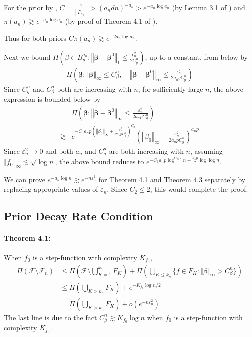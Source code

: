 \documentclass[12pt]{article}
\newcommand{\bm}[1]{\boldsymbol{#1}}
\newcommand{\norm}[1]{\left\Vert#1\right\Vert}
\newcommand{\1}{\mathbb{I}}
\def\C {\,|\:}
\def\C {\,|\:}
\def\mF{\mathcal{F}}
\def\b{\bm{\beta}}
\def\b{\bm{\beta}}
\def\C{\mbox{\boldmath$C$}}
\def\b{\mbox{\boldmath$b$}}
\def\C {\,|\:}
\def\C {\,|\:}
\def\b{\bm{\beta}}
\def\b{\bm{\beta}}
\theoremstyle{plain}
\theoremstyle{definition}
\theoremstyle{remark}
\begin{document}
For the prior by \cite{denison1998bayesian},
$C=\frac{1}{\C F_{a_n}\C} > (a_n d n)^{-a_n} > e^{-a_n \log a_n}$  (by Lemma 3.1 of \cite{rockova2020posterior}) and $\pi(a_n) \gtrsim e^{-a_n \log a_n}$ (by proof of Theorem 4.1 of \cite{rockova2020posterior}).

Thus for both priors $C\pi(a_n) \gtrsim e^{-2a_n\log a_n}$.

Next we bound $\Pi \left (\beta \in B_n^{a_n}: \norm{\b-\b^0}_1 \le \frac{\epsilon_n^2}{2C_g^n} \right)$, up to a constant, from below by
\begin{align*}
 \Pi \left (\b: \norm{\b}_\infty \le C_\beta^n, \quad \norm{\b-\b^0}_\infty \le \frac{\epsilon_n^2}{2a_n q C_g^n} \right)
\end{align*}
Since $C^n_g$ and $C^n_\beta$ both are increasing with $n$, for sufficiently large $n$, the above expression is bounded below by
\begin{align*}
& \Pi \left (\b: \norm{\b-\b^0}_\infty \le \frac{\varepsilon_n^2}{2a_n p C_g^n} \right) \\
\gtrsim & e^{- C_1 a_n p \left (\norm{\beta_0}_\infty+ \frac{\varepsilon_n^2}{2a_n p C_g^n} \right )^{C_2}}\left ( {\norm{\beta_0}_\infty +  \frac{\varepsilon_n^2}{2a_n p C_g^n}} \right)^{a_n p}
\end{align*}
Since $\varepsilon_n^2 \rightarrow 0$ and both $a_n$ and $C_g^n$ are both increasing with $n$, assuming $\norm{f_0}_\infty \lesssim \sqrt{\log n}$, the above bound reduces to $e^{- C_1 a_n p \log^{C_2/2} n + \frac{a_n p}{2}\log\log n}$.

We can prove $e^{-a_n \log n} \gtrsim e^{-n\varepsilon_n^2}$ for Theorem 4.1 and Theorem 4.3 separately by replacing appropriate values of $\varepsilon_n$.  Since $C_2 \le 2$, this would complete the proof. 
\subsection{Prior Decay Rate Condition} \label{sub:decay_proof}

\paragraph{Theorem 4.1:} When $f_0$ is a step-function with complexity $K_{f_0}$,
\begin{align*}
\Pi(\mF \setminus \mF_n)  & \le \Pi(\mF \setminus \bigcup_{K=1}^{k_n} F_K)  + \Pi(\bigcup_{K \le k_n} \{f \in F_K: \norm{\beta}_\infty > C_\beta^n \}) \\
& \le \Pi(\bigcup_{K>k_n}F_K)  + e^{-K_{f_0}\log n/2}\\
  & = \Pi(\bigcup_{K>k_n}F_K)  + o(e^{-n \varepsilon_n^2})
\end{align*}
The last line is due to the fact $C_\beta^n \gtrsim K_{f_0}\log n$ when $f_0$ is a step-function with complexity $K_{f_0}$.
\end{document}
